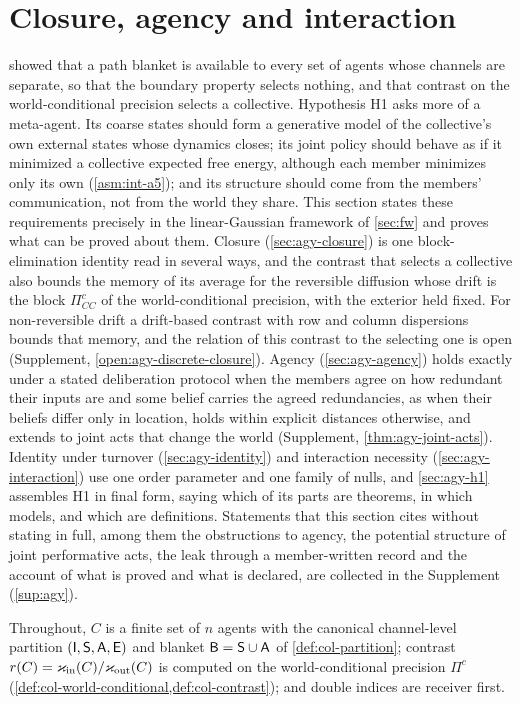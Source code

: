 \section{Closure, agency and interaction}\label{sec:agy}

 showed that a path blanket is available to every set of agents whose channels are separate, so that the boundary property selects nothing, and that contrast on the world-conditional precision selects a collective. Hypothesis H1 asks more of a meta-agent. Its coarse states should form a generative model of the collective's own external states whose dynamics closes; its joint policy should behave as if it minimized a collective expected free energy, although each member minimizes only its own (\cref{asm:int-a5}); and its structure should come from the members' communication, not from the world they share. This section states these requirements precisely in the linear-Gaussian framework of \cref{sec:fw} and proves what can be proved about them. Closure (\cref{sec:agy-closure}) is one block-elimination identity read in several ways, and the contrast that selects a collective also bounds the memory of its average for the reversible diffusion whose drift is the block $\Pi^c_{CC}$ of the world-conditional precision, with the exterior held fixed. For non-reversible drift a drift-based contrast with row and column dispersions bounds that memory, and the relation of this contrast to the selecting one is open (Supplement, \cref{open:agy-discrete-closure}). Agency (\cref{sec:agy-agency}) holds exactly under a stated deliberation protocol when the members agree on how redundant their inputs are and some belief carries the agreed redundancies, as when their beliefs differ only in location, holds within explicit distances otherwise, and extends to joint acts that change the world (Supplement, \cref{thm:agy-joint-acts}). Identity under turnover (\cref{sec:agy-identity}) and interaction necessity (\cref{sec:agy-interaction}) use one order parameter and one family of nulls, and \cref{sec:agy-h1} assembles H1 in final form, saying which of its parts are theorems, in which models, and which are definitions. Statements that this section cites without stating in full, among them the obstructions to agency, the potential structure of joint performative acts, the leak through a member-written record and the account of what is proved and what is declared, are collected in the Supplement (\cref{sup:agy}).

Throughout, $C$ is a finite set of $n$ agents with the canonical channel-level partition $(\mathsf{I},\mathsf{S},\mathsf{A},\mathsf{E})$ and blanket $\mathsf{B}=\mathsf{S}\cup\mathsf{A}$ of \cref{def:col-partition}; contrast $r(C)=\varkappa_{\mathrm{in}}(C)/\varkappa_{\mathrm{out}}(C)$ is computed on the world-conditional precision $\Pi^c$ (\cref{def:col-world-conditional,def:col-contrast}); and double indices are receiver first.


